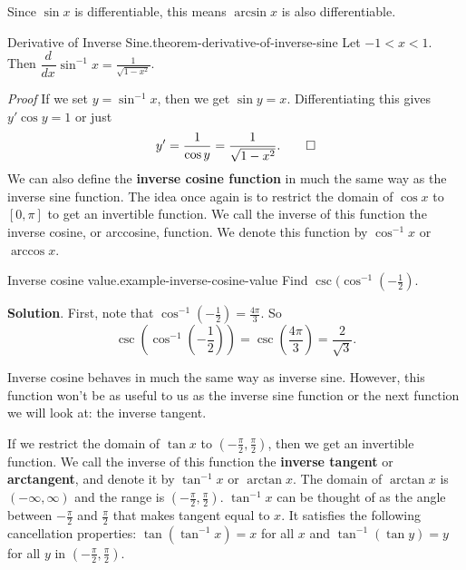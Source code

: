\documentclass[10pt,]{book}
\makeatletter
\newcommand{\terminology}[1]{\textbf{#1}}
\renewcommand*{\proofname}{Proof}
\renewenvironment{proof}[1][\proofname]{\par
  \pushQED{\qed}%
  \normalfont \topsep6\p@\@plus6\p@\relax
  \trivlist
  \item\relax
    {\itshape
    #1\@addpunct{.}}\hspace\labelsep\ignorespaces
}{%
  \popQED\endtrivlist\@endpefalse
}
\numberwithin{equation}{section}
\newcommand{\dv}[3][]{\dfrac{d^{#1} #2}{d #3^{#1}}}
\makeatother
\begin{document}
\hypertarget{p-265}{}%
Since \(\sin x\) is differentiable, this means \(\arcsin x\) is also differentiable.%
\begin{theorem}{Derivative of Inverse Sine.}{}{theorem-derivative-of-inverse-sine}%
\hypertarget{p-266}{}%
Let \(-1 < x < 1\). Then \(\dv{}{x}\sin^{-1}x = \frac{1}{\sqrt{1-x^{2}}}\).%
\end{theorem}
\begin{proof}\hypertarget{proof-6}{}
\hypertarget{p-267}{}%
If we set \(y = \sin^{-1}x\), then we get \(\sin y = x\). Differentiating this gives \(y'\cos y = 1\) or just%
\begin{equation*}
y' = \frac{1}{\cos y} = \frac{1}{\sqrt{1-x^{2}}}.\qedhere
\end{equation*}
%
\end{proof}
\hypertarget{p-268}{}%
We can also define the \terminology{inverse cosine function} in much the same way as the inverse sine function. The idea once again is to restrict the domain of \(\cos x\) to \([0,\pi]\) to get an invertible function. We call the inverse of this function the inverse cosine, or arccosine, function. We denote this function by \(\cos^{-1}x\) or \(\arccos x\).%
\begin{example}{Inverse cosine value.}{example-inverse-cosine-value}%
\hypertarget{p-269}{}%
Find \(\csc(\cos^{-1}(-\frac{1}{2})\).%
\par\smallskip%
\noindent\textbf{Solution}.\hypertarget{solution-58}{}\quad%
\hypertarget{p-270}{}%
First, note that \(\cos^{-1}(-\frac{1}{2}) = \frac{4\pi}{3}\). So%
\begin{equation*}
\csc(\cos^{-1}(-\frac{1}{2})) = \csc(\frac{4\pi}{3}) = \frac{2}{\sqrt{3}}.
\end{equation*}
%
\end{example}
\hypertarget{p-271}{}%
Inverse cosine behaves in much the same way as inverse sine. However, this function won't be as useful to us as the inverse sine function or the next function we will look at: the inverse tangent.%
\par
\hypertarget{p-272}{}%
If we restrict the domain of \(\tan x\) to \((-\frac{\pi}{2}, \frac{\pi}{2})\), then we get an  invertible function. We call the inverse of this function the \terminology{inverse tangent} or \terminology{arctangent}, and denote it by \(\tan^{-1}x\) or \(\arctan x\). The domain of \(\arctan x\) is \((-\infty,\infty)\) and the range is \((-\frac{\pi}{2},\frac{\pi}{2})\). \(\tan^{-1}x\) can be thought of as the angle between \(-\frac{\pi}{2}\) and \(\frac{\pi}{2}\) that makes tangent equal to \(x\). It satisfies the following cancellation properties: \(\tan(\tan^{-1}x) = x\) for all \(x\) and \(\tan^{-1}(\tan y) = y\) for all \(y\) in \((-\frac{\pi}{2},\frac{\pi}{2})\).%
\end{document}
